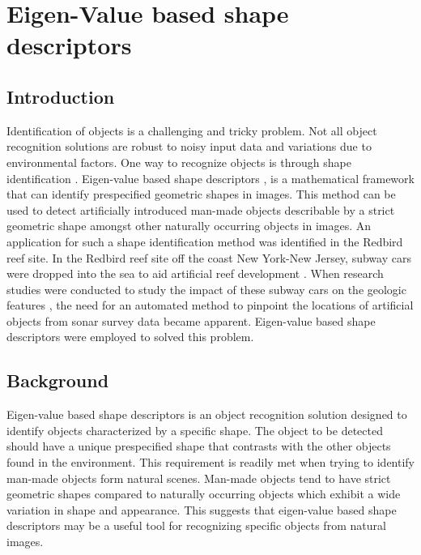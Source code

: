 
\chapter{Eigen-Value based shape descriptors}
\label{chap:eigen}



\section{Introduction}

Identification of objects is a challenging and tricky problem. Not all object recognition solutions are robust to noisy input data and variations due to environmental factors. One way to recognize objects is through shape identification \cite{shape_survey}. Eigen-value based shape descriptors \cite{khabou,zuliani}, is a mathematical framework that can identify prespecified geometric shapes in images. This method can be used to detect artificially introduced man-made objects describable by a strict geometric shape amongst other naturally occurring objects in images. An application for such a shape identification method was identified in the Redbird reef site. In the Redbird reef site off the coast New York-New Jersey, subway cars were dropped into the sea to aid artificial reef development \cite{redbird1, redbird2}. When research studies were conducted to study the impact of these subway cars on the geologic features \cite{redbird_nicole, redbird_art}, the need for an automated method to pinpoint the 
locations of artificial objects 
from sonar survey data became apparent. Eigen-value based shape descriptors were employed to solved this problem.


\section{Background}

Eigen-value based shape descriptors is an object recognition solution designed to identify objects characterized by a specific shape. The object to be detected should have a unique prespecified shape that contrasts with the other objects found in the environment. This requirement is readily met when trying to identify man-made objects form natural scenes. Man-made objects tend to have strict geometric shapes compared to naturally occurring objects which exhibit a wide variation in shape and appearance. This suggests that eigen-value based shape descriptors may be a useful tool for recognizing specific objects from natural images.

